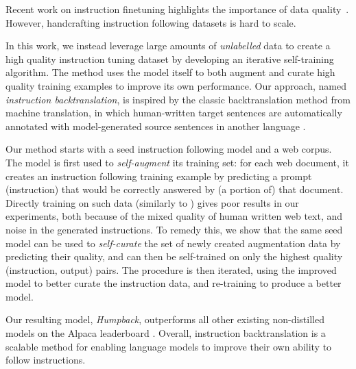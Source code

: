 Recent work on instruction finetuning highlights the importance of data quality~\cite{zhou2023lima,kopf2023openassistant}. However, handcrafting instruction following datasets is hard to scale. 
\fi

In this work, we instead leverage large amounts of \emph{unlabelled} data to create a high quality instruction tuning dataset by developing an iterative self-training algorithm. The method uses the model itself to both augment  and curate
high quality  training examples to improve its own performance. Our approach, named {\em instruction backtranslation}, is inspired by the classic {backtranslation} method from machine translation, in which human-written target sentences are automatically annotated with model-generated source sentences in another language \citep{sennrich2015improving}. 

Our method starts with a seed instruction following model and a web corpus. The model is first used to \textit{self-augment} its training set: for each web document, it creates an instruction following training example by predicting a  prompt (instruction) that would be correctly answered by (a portion of) that document. Directly training on such data (similarly to \cite{koksal2023longform}) gives poor results in our experiments, 
both because of the mixed quality of human written web text, and noise in the generated instructions. To remedy this, we show that the same seed model can be used to \textit{self-curate}
the set of newly created augmentation data by predicting their quality, and  can then be  self-trained on only the highest quality (instruction, output) pairs. 
The procedure is then iterated, using the improved model to better curate the instruction  data, and re-training to produce a better model.

Our resulting model, {\em Humpback}, outperforms
all other existing non-distilled models on the Alpaca leaderboard \citep{alpaca_eval}. 
Overall, instruction backtranslation is a scalable method for enabling language models to improve their own ability to follow instructions.

